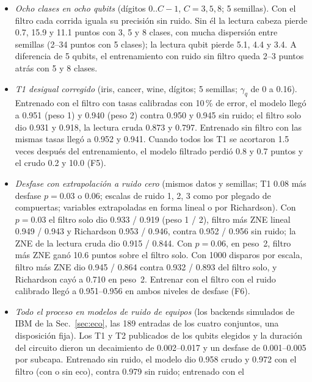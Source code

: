 \documentclass[11pt]{article}
\begin{document}
\begin{itemize}
  de la Sec.~\ref{sec:eco}, 5 circuitos de eco por modelo). Aquí un error dentro del sector es una confusión de clase, y
  el eco corrige una parte: en promedio sobre los backends la lectura cabeza dio 0.858 cruda, 0.890 con el filtro y
  0.900 con filtro más eco, contra 0.91 sin ruido.
\item \textit{Ocho clases en ocho qubits} (dígitos 0..$C-1$, $C=3,5,8$; 5 semillas). Con el filtro cada corrida iguala
  su precisión sin ruido. Sin él la lectura cabeza pierde 0.7, 15.9 y 11.1 puntos con 3, 5 y 8 clases, con mucha
  dispersión entre semillas (2--34 puntos con 5 clases); la lectura qubit pierde 5.1, 4.4 y 3.4. A diferencia de 5
  qubits, el entrenamiento con ruido sin filtro queda 2--3 puntos atrás con 5 y 8 clases.
\item \textit{T1 desigual corregido} (iris, cancer, wine, dígitos; 5 semillas; $\gamma_q$ de 0 a 0.16). Entrenado con el
  filtro con tasas calibradas con 10\,\% de error, el modelo llegó a 0.951 (peso 1) y 0.940 (peso 2) contra 0.950 y
  0.945 sin ruido; el filtro solo dio 0.931 y 0.918, la lectura cruda 0.873 y 0.797. Entrenado sin filtro con las
  mismas tasas llegó a 0.952 y 0.941. Cuando todos los T1 se acortaron 1.5 veces después del entrenamiento, el modelo
  filtrado perdió 0.8 y 0.7 puntos y el crudo 0.2 y 10.0 (F5).
\item \textit{Desfase con extrapolación a ruido cero} (mismos datos y semillas; T1 0.08 más desfase $p=0.03$ o 0.06;
  escalas de ruido 1, 2, 3 como por plegado de compuertas; variables extrapoladas en forma lineal o por Richardson). Con
  $p=0.03$ el filtro solo dio 0.933 / 0.919 (peso 1 / 2), filtro más ZNE lineal 0.949 / 0.943 y Richardson 0.953 /
  0.946, contra 0.952 / 0.956 sin ruido; la ZNE de la lectura cruda dio 0.915 / 0.844. Con $p=0.06$, en peso~2, filtro
  más ZNE ganó 10.6 puntos sobre el filtro solo. Con 1000 disparos por escala, filtro más ZNE dio 0.945 / 0.864 contra
  0.932 / 0.893 del filtro solo, y Richardson cayó a 0.710 en peso~2. Entrenar con el filtro con el ruido calibrado
  llegó a 0.951--0.956 en ambos niveles de desfase (F6).
\item \textit{Todo el proceso en modelos de ruido de equipos} (los backends simulados de IBM de la Sec.~\ref{sec:eco}, las
  189 entradas de los cuatro conjuntos, una disposición fija). Los T1 y T2 publicados de los qubits elegidos y la
  duración del circuito dieron un decaimiento de 0.002--0.017 y un desfase de 0.001--0.005 por subcapa. Entrenado sin
  ruido, el modelo dio 0.958 crudo y 0.972 con el filtro (con o sin eco), contra 0.979 sin ruido; entrenado con el

\end{itemize}
\end{document}
